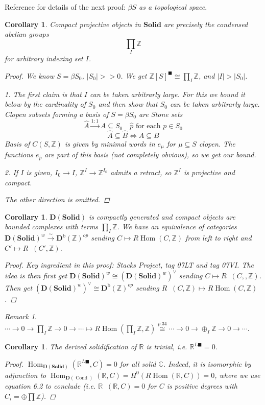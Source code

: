 \documentclass[12pt]{article}
\theoremstyle{darkgreentheorem}
\newtheorem{cor}[thm]{Corollary}
\theoremstyle{darkbluedefinition}
\theoremstyle{darkredexample}
\theoremstyle{remark}
\newtheorem{rem}[thm]{Remark}
\newcommand{\Z}{\mathbb{Z}}
\newcommand{\R}{\mathbb{R}}
\newcommand{\1}{\mathbbm{1}}
\newcommand{\C}{\mathbb{C}}
\newcommand{\D}{\mathbf{D}}
\newcommand{\Db}{\mathbf{D}^{\mathrm{b}}}
\newcommand{\Solid}{\mathbf{Solid}}
\DeclareMathOperator{\Hom}{Hom}
\DeclareMathOperator{\Cond}{Cond}
\DeclareMathOperator{\ihom}{\underline{Hom}}
\newcommand{\op}{\oplus}
\newcommand{\dual}{^{\vee}}
\newcommand{\sub}{\subseteq}
\newcommand{\solid}{^{\blacksquare}}
\newcommand{\dsolid}{^{L\blacksquare}}
\begin{document}
Reference for details of the next proof: \textit{$\beta S$ as a topological space}.
\begin{cor}
    Compact projective objects in $\Solid$ are precisely the condensed abelian groups
    \[ \prod_{I} \Z \]
    for arbitrary indexing set $I$.
    \begin{proof}
	We know $S=\beta S_{0}$, $|S_{0}|>> 0$.
	We get $\Z[S]\solid \cong \prod_{I}\Z$, and $|I|>|S_{0}|$.
	
	1. The first claim is that $I$ can be taken arbitrarly large.
	For this we bound it below by the cardinality of $S_{0}$ and then show that $S_{0}$ can be taken arbitrarly large.
	Clopen subsets forming a basis of $S=\beta S_{0}$ are \textit{Stone sets}
	\[ \hat{A}\overset{1:1}{\longrightarrow} A\sub S_{0} \quad \hat{p} \text{ for each }p\in S_{0}\]
	\[ \hat{A}\sub \hat{B} \Leftrightarrow A\sub B\]
	Basis of $C(S,\Z)$ is given by minimal words in $e_{\mu}$ for $\mu\sub S$ clopen.
	The functions $e_{\hat{p}}$ are part of this basis (not completely obvious), so we get our bound.

	2. If $I$ is given, $I_{0}\to I$, $\Z^{I}\to \Z^{I_{0}}$ admits a retract, so $\Z^{I}$ is projective and compact.

	The other direction is omitted.
    \end{proof}
\end{cor}

\begin{cor}
    $\D(\Solid)$ is compactly generated and compact objects are bounded complexes with terms $\prod_{I}\Z$.
    We have an equivalence of categories $\D(\Solid)^{w}\xrightarrow{\sim} \Db(\Z)^{op}$ sending $C\mapsto R\Hom(C,\Z)$ from left to right and $C'\mapsto R\ihom(C',\Z)$.
    \begin{proof}
	Key ingredient in this proof: Stacks Project, tag 07LT and tag 07VI.
	The idea is then first get $\D(\Solid)^{w}\cong (\D(\Solid)^{w})\dual $ sending $C\mapsto R\ihom(C,,\Z)$.
	Then get $(\D(\Solid)^{w})\dual \cong \Db(\Z)^{op}$ sending $R\ihom(C,\Z)\mapsto R\Hom(C,\Z)$.
    \end{proof}
\end{cor}

\begin{rem}
    $\cdots \to 0 \to \prod_{I}\Z \to 0 \to \cdots \mapsto R\Hom(\prod_{I}\Z,\Z)\overset{p. 34}{\cong} \cdots \to 0\to \op_{I}\Z\to 0\to \cdots $.
\end{rem}

\begin{cor}
    The derived solidification of $\R$ is trivial, i.e. $\R\dsolid=0$.
    \begin{proof}
	$\Hom_{\D(\Solid)}(\R\dsolid,C)=0$ for all solid $\C$.
	Indeed, it is isomorphic by adjunction to $\Hom_{\D(\Cond)}(\R,C)=H^{0}(R\Hom(\R,C))=0$, where we use equation 6.2 to conclude (i.e. $\R\ihom(\R,C)=0$ for $C$ is positive degrees with $C_{i}=\op\prod\Z$).
    \end{proof}
\end{cor}
\end{document}

